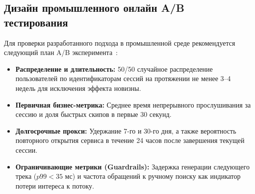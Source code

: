 \subsection{Дизайн промышленного онлайн A/B тестирования}
Для проверки разработанного подхода в промышленной среде рекомендуется следующий план A/B эксперимента~\cite{volkov2026session}:
\begin{itemize}
    \item \textbf{Распределение и длительность:} 50/50 случайное распределение пользователей по идентификаторам сессий на протяжении не менее 3--4 недель для исключения эффекта новизны.
    \item \textbf{Первичная бизнес-метрика:} Среднее время непрерывного прослушивания за сессию и доля быстрых скипов в первые 30 секунд.
    \item \textbf{Долгосрочные прокси:} Удержание 7-го и 30-го дня, а также вероятность повторного открытия сервиса в течение 24 часов после завершения текущей сессии.
    \item \textbf{Ограничивающие метрики (Guardrails):} Задержка генерации следующего трека ($p99 < 35$ мс) и частота обращений к ручному поиску как индикатор потери интереса к потоку.
\end{itemize}
